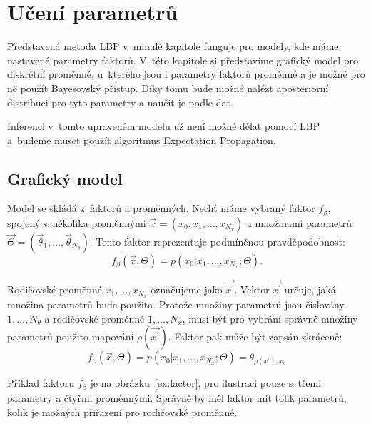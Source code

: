 \chapter{Učení parametrů}
\label{ch:ep}

Představená metoda LBP v~minulé kapitole funguje pro modely, kde máme nastavené parametry faktorů.
V~této kapitole si představíme grafický model pro diskrétní proměnné, u~kterého jsou i parametry faktorů proměnné a je možné pro ně použít Bayesovský přístup.
Díky tomu bude možné nalézt aposteriorní distribuci pro tyto parametry a naučit je podle dat.

Inferenci v~tomto upraveném modelu už není možné dělat pomocí LBP a~budeme muset použít algoritmus Expectation Propagation.

\section{Grafický model}

Model se skládá z~faktorů a proměnných.
Nechť máme vybraný faktor $f_\beta$, spojený s~několika proměnnými
$\vec{x} = (x_0, x_1, \dots, x_{N_x})$
a množinami parametrů
$\vec{\Theta} = (\vec{\theta}_1, \dots, \vec{\theta}_{N_\theta})$.
Tento faktor reprezentuje podmíněnou pravděpodobnost:
$$f_\beta(\vec{x}, \Theta) = p(x_0 | x_1, \dots, x_{N_x}; \Theta).$$

Rodičovské proměnné $x_1, \dots, x_{N_x}$ označujeme jako $\vec{x^\prime}$.
Vektor $\vec{x^\prime}$ určuje, jaká množina parametrů bude použita.
Protože množiny parametrů jsou číslovány $1, \dots, N_\theta$ a rodičovské
proměnné $1, \dots, N_x$, musí být pro vybrání správné množiny parametrů
použito mapování $\rho(\vec{x^\prime})$.
Faktor pak může být zapsán zkráceně:
$$f_\beta(\vec{x}, \Theta) = p(x_0 | x_1, \dots, x_{N_x}; \Theta) =
\theta_{\rho(x^\prime), x_0}$$

Příklad faktoru $f_\beta$ je na obrázku~\ref{ex:factor}, pro ilustraci pouze s~třemi parametry a čtyřmi proměnnými.
Správně by měl faktor mít tolik parametrů, kolik je možných přiřazení pro rodičovské proměnné.

